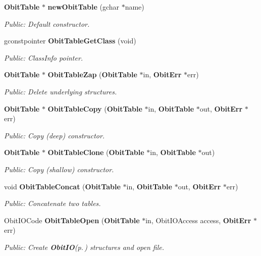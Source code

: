 \begin{CompactItemize}
{\bf Obit\-Table} $\ast$ {\bf new\-Obit\-Table} (gchar $\ast$name)
\begin{CompactList}\small\item\em Public: Default constructor. \item\end{CompactList}\item 
gconstpointer {\bf Obit\-Table\-Get\-Class} (void)
\begin{CompactList}\small\item\em Public: Class\-Info pointer. \item\end{CompactList}\item 
{\bf Obit\-Table} $\ast$ {\bf Obit\-Table\-Zap} ({\bf Obit\-Table} $\ast$in, {\bf Obit\-Err} $\ast$err)
\begin{CompactList}\small\item\em Public: Delete underlying structures. \item\end{CompactList}\item 
{\bf Obit\-Table} $\ast$ {\bf Obit\-Table\-Copy} ({\bf Obit\-Table} $\ast$in, {\bf Obit\-Table} $\ast$out, {\bf Obit\-Err} $\ast$err)
\begin{CompactList}\small\item\em Public: Copy (deep) constructor. \item\end{CompactList}\item 
{\bf Obit\-Table} $\ast$ {\bf Obit\-Table\-Clone} ({\bf Obit\-Table} $\ast$in, {\bf Obit\-Table} $\ast$out)
\begin{CompactList}\small\item\em Public: Copy (shallow) constructor. \item\end{CompactList}\item 
void {\bf Obit\-Table\-Concat} ({\bf Obit\-Table} $\ast$in, {\bf Obit\-Table} $\ast$out, {\bf Obit\-Err} $\ast$err)
\begin{CompactList}\small\item\em Public: Concatenate two tables. \item\end{CompactList}\item 
Obit\-IOCode {\bf Obit\-Table\-Open} ({\bf Obit\-Table} $\ast$in, Obit\-IOAccess access, {\bf Obit\-Err} $\ast$err)
\begin{CompactList}\small\item\em Public: Create {\bf Obit\-IO}{\rm (p.\,\pageref{structObitIO})} structures and open file. \item\end{CompactList}\item 

\end{CompactItemize}
